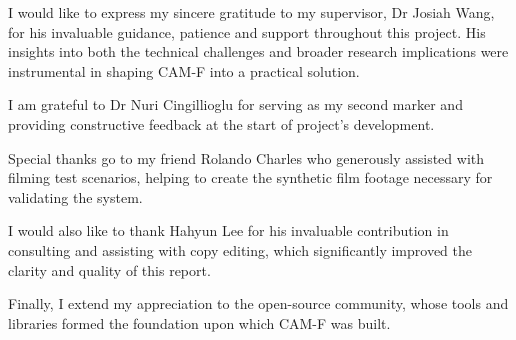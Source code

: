 
I would like to express my sincere gratitude to my supervisor, Dr Josiah Wang, for his invaluable guidance, patience and support throughout this project. His insights into both the technical challenges and broader research implications were instrumental in shaping CAM-F into a practical solution.

I am grateful to Dr Nuri Cingillioglu for serving as my second marker and providing constructive feedback at the start of project's development.

Special thanks go to my friend Rolando Charles who generously assisted with filming test scenarios, helping to create the synthetic film footage necessary for validating the system.

I would also like to thank Hahyun Lee for his invaluable contribution in consulting and assisting with copy editing, which significantly improved the clarity and quality of this report.

Finally, I extend my appreciation to the open-source community, whose tools and libraries formed the foundation upon which CAM-F was built.